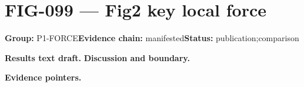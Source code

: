 \clearpage
\section{FIG-099 --- Fig2 key local force}
\label{figpage:fig-099}
\textbf{Group:} P1-FORCE\quad \textbf{Evidence chain:} manifested\quad \textbf{Status:} publication;comparison

\textbf{Results text draft.} 
\textbf{Discussion and boundary.} 


\textbf{Evidence pointers.}



\vfill
